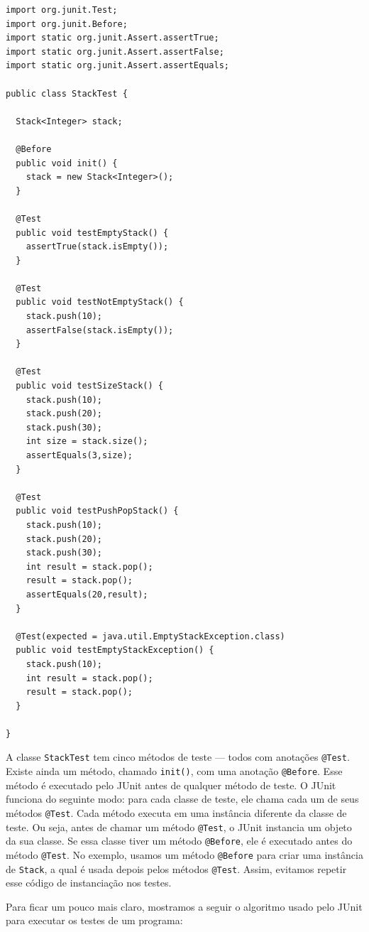 \documentclass[
  11pt,
  twoside]{book}
\newcommand{\passthrough}[1]{#1}
\begin{document}
\begin{lstlisting}
import org.junit.Test;
import org.junit.Before;
import static org.junit.Assert.assertTrue;
import static org.junit.Assert.assertFalse;
import static org.junit.Assert.assertEquals;

public class StackTest {

  Stack<Integer> stack;

  @Before
  public void init() {
    stack = new Stack<Integer>();
  }

  @Test
  public void testEmptyStack() {
    assertTrue(stack.isEmpty());
  }

  @Test
  public void testNotEmptyStack() {
    stack.push(10);
    assertFalse(stack.isEmpty());
  }

  @Test
  public void testSizeStack() {
    stack.push(10);
    stack.push(20);
    stack.push(30);
    int size = stack.size();
    assertEquals(3,size);
  }

  @Test
  public void testPushPopStack() {
    stack.push(10);
    stack.push(20);
    stack.push(30);
    int result = stack.pop();
    result = stack.pop();
    assertEquals(20,result);
  }

  @Test(expected = java.util.EmptyStackException.class)
  public void testEmptyStackException() {
    stack.push(10);
    int result = stack.pop();
    result = stack.pop();
  }

}
\end{lstlisting}

A classe \passthrough{\lstinline!StackTest!} tem cinco métodos de teste
--- todos com anotações \passthrough{\lstinline!@Test!}. Existe ainda um
método, chamado \passthrough{\lstinline!init()!}, com uma anotação
\passthrough{\lstinline!@Before!}. Esse método é executado pelo JUnit
antes de qualquer método de teste. O JUnit funciona do seguinte modo:
para cada classe de teste, ele chama cada um de seus métodos
\passthrough{\lstinline!@Test!}. Cada método executa em uma instância
diferente da classe de teste. Ou seja, antes de chamar um método
\passthrough{\lstinline!@Test!}, o JUnit instancia um objeto da sua
classe. Se essa classe tiver um método
\passthrough{\lstinline!@Before!}, ele é executado antes do método
\passthrough{\lstinline!@Test!}. No exemplo, usamos um método
\passthrough{\lstinline!@Before!} para criar uma instância de
\passthrough{\lstinline!Stack!}, a qual é usada depois pelos métodos
\passthrough{\lstinline!@Test!}. Assim, evitamos repetir esse código de
instanciação nos testes.

Para ficar um pouco mais claro, mostramos a seguir o algoritmo usado
pelo JUnit para executar os testes de um programa:
\end{document}
